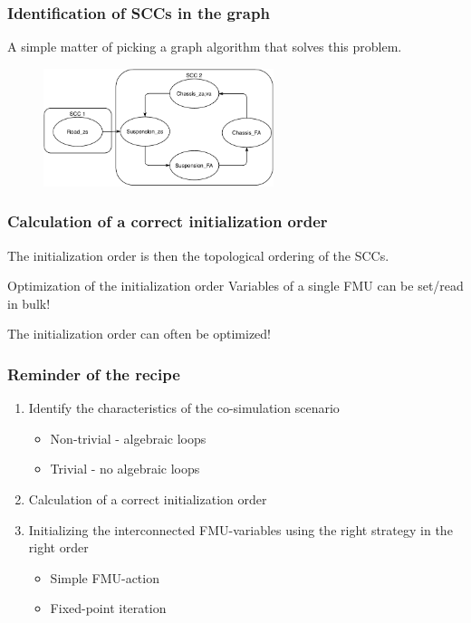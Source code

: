 \documentclass{beamer}
\begin{document}
\begin{frame}
\frametitle{Identification of SCCs in the graph}
A simple matter of picking a graph algorithm that solves this problem.
\begin{figure}
    \centering
    \includegraphics[width=0.6\textwidth]{images/quarter_car-SCC.pdf}
\end{figure}

\end{frame}

\begin{frame}
\frametitle{Calculation of a correct initialization order}
The initialization order is then the topological ordering of the SCCs.

\begin{exampleblock}{Optimization of the initialization order}
Variables of a single FMU can be set/read in bulk!
\end{exampleblock}
The initialization order can often be optimized!
\end{frame}

\begin{frame}
\frametitle{Reminder of the recipe}
\begin{enumerate}[I]
    \item Identify the characteristics of the co-simulation scenario
    \begin{itemize}
        \item Non-trivial - algebraic loops
        \item Trivial - no algebraic loops
    \end{itemize}
    \item Calculation of a correct initialization order
    \item Initializing the interconnected FMU-variables using the right strategy in the right order
    \begin{itemize}
        \item Simple FMU-action
        \item Fixed-point iteration
    \end{itemize}
\end{enumerate}
\end{frame}
\end{document}
